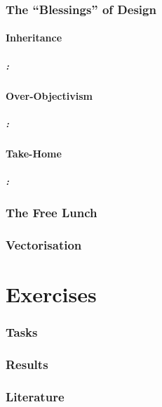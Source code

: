 \documentclass[9pt,xcolor=table]{beamer}
\begin{document}
\section{The ``Blessings'' of Design}
\subsection{Inheritance}
\begin{frame}
\frametitle{\insertsectionhead{}: \insertsubsectionhead{}}
\end{frame}

\subsection{Over-Objectivism}
\begin{frame}
\frametitle{\insertsectionhead{}: \insertsubsectionhead{}}
\end{frame}

\subsection{Take-Home}
\begin{frame}
\frametitle{\insertsectionhead{}: \insertsubsectionhead{}}
\end{frame}

\section{The Free Lunch}

\section{Vectorisation}


\part{Exercises}
\section{Tasks}
\section{Results}

\section{Literature}
\begin{frame}[c]
\frametitle{\insertsection{}}
\nocite{*}
\tiny%


\end{frame}
\end{document}
